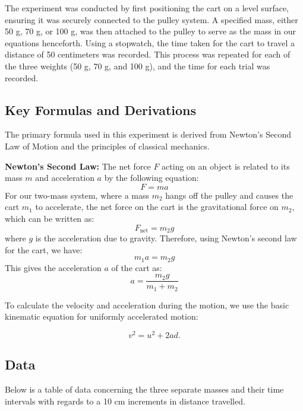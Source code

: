 \documentclass{article}
\begin{document}
The experiment was conducted by first positioning the cart on a level surface, ensuring it was securely connected to the pulley system. A specified mass, either 50 g, 70 g, or 100 g, was then attached to the pulley to serve as the mass in our equations henceforth. Using a stopwatch, the time taken for the cart to travel a distance of 50 centimeters was recorded. This process was repeated for each of the three weights (50 g, 70 g, and 100 g), and the time for each trial was recorded.

\subsection{Key Formulas and Derivations}

The primary formula used in this experiment is derived from Newton's Second Law of Motion and the principles of classical mechanics. 

\textbf{Newton's Second Law:}
The net force \( F \) acting on an object is related to its mass \( m \) and acceleration \( a \) by the following equation:
\[
F = ma
\]
For our two-mass system, where a mass \( m_2 \) hangs off the pulley and causes the cart \( m_1 \) to accelerate, the net force on the cart is the gravitational force on \( m_2 \), which can be written as:
\[
F_{\text{net}} = m_2 g
\]
where \( g \) is the acceleration due to gravity. Therefore, using Newton's second law for the cart, we have:
\[
m_1 a = m_2 g
\]
This gives the acceleration \( a \) of the cart as:
\[
a = \frac{m_2 g}{m_1 + m_2}
\]


To calculate the velocity and acceleration during the motion, we use the basic kinematic equation for uniformly accelerated motion:

\[
v^2 = u^2 + 2 a d. 
\]



\subsection{Data}

Below is a table of data concerning the three separate masses and their time intervals with regards to a 10 cm increments in distance travelled.
\end{document}
